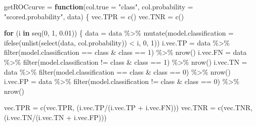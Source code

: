\documentclass[
]{article}
\newenvironment{Shaded}{\begin{snugshade}}{\end{snugshade}}
\newcommand{\AttributeTok}[1]{\textcolor[rgb]{0.77,0.63,0.00}{#1}}
\newcommand{\ControlFlowTok}[1]{\textcolor[rgb]{0.13,0.29,0.53}{\textbf{#1}}}
\newcommand{\DecValTok}[1]{\textcolor[rgb]{0.00,0.00,0.81}{#1}}
\newcommand{\FloatTok}[1]{\textcolor[rgb]{0.00,0.00,0.81}{#1}}
\newcommand{\FunctionTok}[1]{\textcolor[rgb]{0.00,0.00,0.00}{#1}}
\newcommand{\NormalTok}[1]{#1}
\newcommand{\OtherTok}[1]{\textcolor[rgb]{0.56,0.35,0.01}{#1}}
\newcommand{\SpecialCharTok}[1]{\textcolor[rgb]{0.00,0.00,0.00}{#1}}
\newcommand{\StringTok}[1]{\textcolor[rgb]{0.31,0.60,0.02}{#1}}
\begin{document}
\begin{Shaded}
\begin{Highlighting}[]
\NormalTok{getROCcurve }\OtherTok{=} \ControlFlowTok{function}\NormalTok{(}\AttributeTok{col.true =} \StringTok{"class"}\NormalTok{, }\AttributeTok{col.probability =} \StringTok{"scored.probability"}\NormalTok{, data) \{}
\NormalTok{  vec.TPR }\OtherTok{=} \FunctionTok{c}\NormalTok{()}
\NormalTok{  vec.TNR }\OtherTok{=} \FunctionTok{c}\NormalTok{()}

  \ControlFlowTok{for}\NormalTok{ (i }\ControlFlowTok{in} \FunctionTok{seq}\NormalTok{(}\DecValTok{0}\NormalTok{, }\DecValTok{1}\NormalTok{, }\FloatTok{0.01}\NormalTok{)) \{}
\NormalTok{    data }\OtherTok{=}\NormalTok{ data }\SpecialCharTok{\%\textgreater{}\%} \FunctionTok{mutate}\NormalTok{(}\AttributeTok{model.classification =} \FunctionTok{ifelse}\NormalTok{(}\FunctionTok{unlist}\NormalTok{(}\FunctionTok{select}\NormalTok{(data, col.probability)) }\SpecialCharTok{\textless{}}\NormalTok{ i, }\DecValTok{0}\NormalTok{, }\DecValTok{1}\NormalTok{))}
\NormalTok{    i.vec.TP }\OtherTok{=}\NormalTok{ data }\SpecialCharTok{\%\textgreater{}\%} \FunctionTok{filter}\NormalTok{(model.classification }\SpecialCharTok{==}\NormalTok{ class }\SpecialCharTok{\&}\NormalTok{ class }\SpecialCharTok{==} \DecValTok{1}\NormalTok{) }\SpecialCharTok{\%\textgreater{}\%} \FunctionTok{nrow}\NormalTok{()}
\NormalTok{    i.vec.FN }\OtherTok{=}\NormalTok{ data }\SpecialCharTok{\%\textgreater{}\%} \FunctionTok{filter}\NormalTok{(model.classification }\SpecialCharTok{!=}\NormalTok{ class }\SpecialCharTok{\&}\NormalTok{ class }\SpecialCharTok{==} \DecValTok{1}\NormalTok{) }\SpecialCharTok{\%\textgreater{}\%} \FunctionTok{nrow}\NormalTok{()}
\NormalTok{    i.vec.TN }\OtherTok{=}\NormalTok{ data }\SpecialCharTok{\%\textgreater{}\%} \FunctionTok{filter}\NormalTok{(model.classification }\SpecialCharTok{==}\NormalTok{ class }\SpecialCharTok{\&}\NormalTok{ class }\SpecialCharTok{==} \DecValTok{0}\NormalTok{) }\SpecialCharTok{\%\textgreater{}\%} \FunctionTok{nrow}\NormalTok{()}
\NormalTok{    i.vec.FP }\OtherTok{=}\NormalTok{ data }\SpecialCharTok{\%\textgreater{}\%} \FunctionTok{filter}\NormalTok{(model.classification }\SpecialCharTok{!=}\NormalTok{ class }\SpecialCharTok{\&}\NormalTok{ class }\SpecialCharTok{==} \DecValTok{0}\NormalTok{) }\SpecialCharTok{\%\textgreater{}\%} \FunctionTok{nrow}\NormalTok{()}
    
\NormalTok{    vec.TPR }\OtherTok{=} \FunctionTok{c}\NormalTok{(vec.TPR, (i.vec.TP}\SpecialCharTok{/}\NormalTok{(i.vec.TP }\SpecialCharTok{+}\NormalTok{ i.vec.FN)))}
\NormalTok{    vec.TNR }\OtherTok{=} \FunctionTok{c}\NormalTok{(vec.TNR, (i.vec.TN}\SpecialCharTok{/}\NormalTok{(i.vec.TN }\SpecialCharTok{+}\NormalTok{ i.vec.FP)))}


\end{Highlighting}
\end{Shaded}
\end{document}
